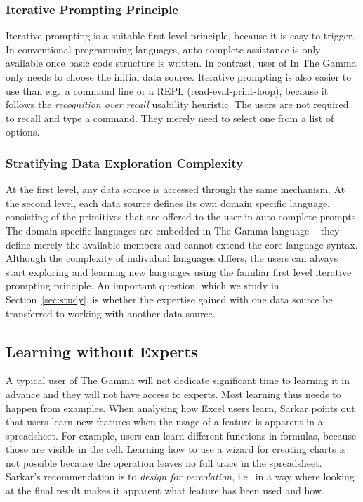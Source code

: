 \documentclass[manuscript,review,anonymous]{acmart}
\begin{document}
\subsubsection*{Iterative Prompting Principle}
Iterative prompting is a suitable first level principle, because it is easy to trigger.
In conventional programming languages, auto-complete assistance is only available once basic
code structure is written. In contrast, user of In The Gamma only needs to choose the initial
data source. Iterative prompting is also easier to use than e.g.~a command line or a REPL
(read-eval-print-loop), because it follows the \emph{recognition over recall} usability heuristic.
The users are not required to recall and type a command. They merely need to select one from a
list of options.

\subsubsection*{Stratifying Data Exploration Complexity}
At the first level, any data source is accessed through the same mechanism. At the second level,
each data source defines its own domain specific language, consisting of the primitives that are
offered to the user in auto-complete prompts. The domain specific languages are embedded in The Gamma
language -- they define merely the available members and cannot extend the core language syntax.
Although the complexity of individual languages differs, the users can always start exploring
and learning new languages using the familiar first level iterative prompting principle.
An important question, which we study in Section~\ref{sec:study}, is whether the expertise gained
with one data source be transferred to working with another data source.

\subsection{Learning without Experts}
\label{sec:design-expert}

A typical user of The Gamma will not dedicate significant time to learning it in advance and
they will not have access to experts. Most learning thus needs to happen from examples.
When analysing how Excel users learn, Sarkar \cite{learning} points out that users learn new
features when the usage of a feature is apparent in a spreadsheet. For example, users can learn
different functions in formulas, because those are visible in the cell. Learning how to use a
wizard for creating charts is not possible because the operation leaves no full trace in the
spreadsheet. Sarkar's recommendation is to \emph{design for percolation},
i.e.~in a way where looking at the final result makes it apparent what feature has been used and how.
\end{document}
